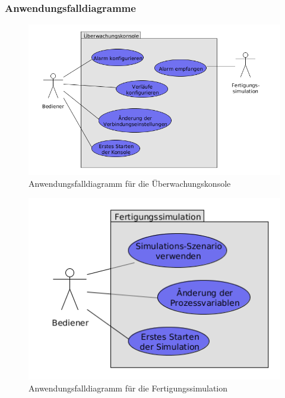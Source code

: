 \documentclass[parskip=full]{scrartcl}
\begin{document}
\subsubsection{Anwendungsfalldiagramme}
\begin{figure}[H]
  \centering
  \includegraphics[scale=0.62]{media/UseCases/Ueberwachungskonsole.png}
  \caption{Anwendungsfalldiagramm für die Überwachungskonsole}
\end{figure}
\begin{figure}[H]
  \centering
  \includegraphics[scale=0.62]{media/UseCases/Fertigungssimulation.png}
  \caption{Anwendungsfalldiagramm für die Fertigungssimulation}
\end{figure}
\end{document}
